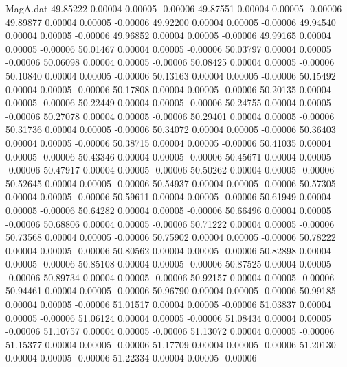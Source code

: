 \begin{filecontents}{MagA.dat}
  49.85222    0.00004    0.00005   -0.00006
  49.87551    0.00004    0.00005   -0.00006
  49.89877    0.00004    0.00005   -0.00006
  49.92200    0.00004    0.00005   -0.00006
  49.94540    0.00004    0.00005   -0.00006
  49.96852    0.00004    0.00005   -0.00006
  49.99165    0.00004    0.00005   -0.00006
  50.01467    0.00004    0.00005   -0.00006
  50.03797    0.00004    0.00005   -0.00006
  50.06098    0.00004    0.00005   -0.00006
  50.08425    0.00004    0.00005   -0.00006
  50.10840    0.00004    0.00005   -0.00006
  50.13163    0.00004    0.00005   -0.00006
  50.15492    0.00004    0.00005   -0.00006
  50.17808    0.00004    0.00005   -0.00006
  50.20135    0.00004    0.00005   -0.00006
  50.22449    0.00004    0.00005   -0.00006
  50.24755    0.00004    0.00005   -0.00006
  50.27078    0.00004    0.00005   -0.00006
  50.29401    0.00004    0.00005   -0.00006
  50.31736    0.00004    0.00005   -0.00006
  50.34072    0.00004    0.00005   -0.00006
  50.36403    0.00004    0.00005   -0.00006
  50.38715    0.00004    0.00005   -0.00006
  50.41035    0.00004    0.00005   -0.00006
  50.43346    0.00004    0.00005   -0.00006
  50.45671    0.00004    0.00005   -0.00006
  50.47917    0.00004    0.00005   -0.00006
  50.50262    0.00004    0.00005   -0.00006
  50.52645    0.00004    0.00005   -0.00006
  50.54937    0.00004    0.00005   -0.00006
  50.57305    0.00004    0.00005   -0.00006
  50.59611    0.00004    0.00005   -0.00006
  50.61949    0.00004    0.00005   -0.00006
  50.64282    0.00004    0.00005   -0.00006
  50.66496    0.00004    0.00005   -0.00006
  50.68806    0.00004    0.00005   -0.00006
  50.71222    0.00004    0.00005   -0.00006
  50.73568    0.00004    0.00005   -0.00006
  50.75902    0.00004    0.00005   -0.00006
  50.78222    0.00004    0.00005   -0.00006
  50.80562    0.00004    0.00005   -0.00006
  50.82898    0.00004    0.00005   -0.00006
  50.85108    0.00004    0.00005   -0.00006
  50.87525    0.00004    0.00005   -0.00006
  50.89734    0.00004    0.00005   -0.00006
  50.92157    0.00004    0.00005   -0.00006
  50.94461    0.00004    0.00005   -0.00006
  50.96790    0.00004    0.00005   -0.00006
  50.99185    0.00004    0.00005   -0.00006
  51.01517    0.00004    0.00005   -0.00006
  51.03837    0.00004    0.00005   -0.00006
  51.06124    0.00004    0.00005   -0.00006
  51.08434    0.00004    0.00005   -0.00006
  51.10757    0.00004    0.00005   -0.00006
  51.13072    0.00004    0.00005   -0.00006
  51.15377    0.00004    0.00005   -0.00006
  51.17709    0.00004    0.00005   -0.00006
  51.20130    0.00004    0.00005   -0.00006
  51.22334    0.00004    0.00005   -0.00006

\end{filecontents}
